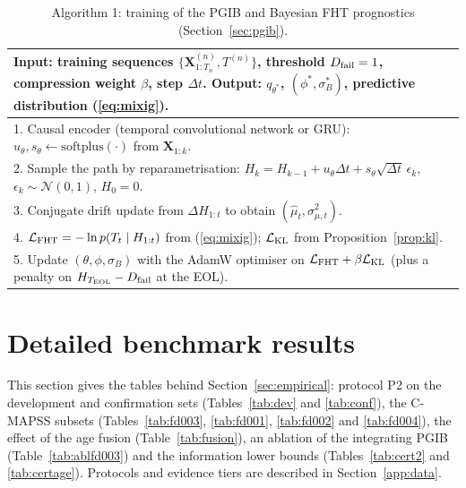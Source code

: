 \documentclass[preprint,12pt]{elsarticle}
\theoremstyle{definition}
\begin{document}
\begin{table}
\caption{Algorithm 1: training of the PGIB and Bayesian FHT prognostics (Section~\ref{sec:pgib}).}
\centering
\begin{tabular}{p{}}
\hline
\textbf{Input:} training sequences $\{\mathbf{X}^{(n)}_{1:T_n},T^{(n)}\}$, threshold $D_{\rm fail}=1$, compression weight $\beta$, step $\Delta t$. \textbf{Output:} $q_{\theta^*}$, $(\phi^*,\sigma_B^*)$, predictive distribution (\ref{eq:mixig}).\\
\hline
1. Causal encoder (temporal convolutional network or GRU): $u_\theta,s_\theta\leftarrow\mathrm{softplus}(\cdot)$ from $\mathbf{X}_{1:k}$.\\
2. Sample the path by reparametrisation: $H_k=H_{k-1}+u_\theta\Delta t+s_\theta\sqrt{\Delta t}\,\epsilon_k$, $\epsilon_k\sim\mathcal N(0,1)$, $H_0=0$.\\
3. Conjugate drift update from $\Delta H_{1:t}$ to obtain $(\hat\mu_t,\sigma^2_{\mu,t})$.\\
4. $\mathcal{L}_{\rm FHT}=-\ln p(T_t\mid H_{1:t})$ from (\ref{eq:mixig}); $\mathcal{L}_{\rm KL}$ from Proposition~\ref{prop:kl}.\\
5. Update $(\theta,\phi,\sigma_B)$ with the AdamW optimiser on $\mathcal{L}_{\rm FHT}+\beta\mathcal{L}_{\rm KL}$ (plus a penalty on $H_{T_{\rm EOL}}-D_{\rm fail}$ at the EOL).\\
\hline
\end{tabular}
\end{table}

\section{Detailed benchmark results}
\label{app:results}
This section gives the tables behind Section~\ref{sec:empirical}: protocol P2 on the development and confirmation sets (Tables~\ref{tab:dev} and \ref{tab:conf}), the C-MAPSS subsets (Tables~\ref{tab:fd003}, \ref{tab:fd001}, \ref{tab:fd002} and \ref{tab:fd004}), the effect of the age fusion (Table~\ref{tab:fusion}), an ablation of the integrating PGIB (Table~\ref{tab:ablfd003}) and the information lower bounds (Tables~\ref{tab:cert2} and \ref{tab:certage}). Protocols and evidence tiers are described in Section~\ref{app:data}.

\begin{table}
\caption{Protocol P2, development sets. RMSE, MAE and CRPS in cycles (batteries) or $10$~s snapshots (bearings); mean $\pm$ standard deviation over seeds; bold: lowest RMSE.}
\centering\small

\label{tab:dev}
\end{table}
\end{document}
